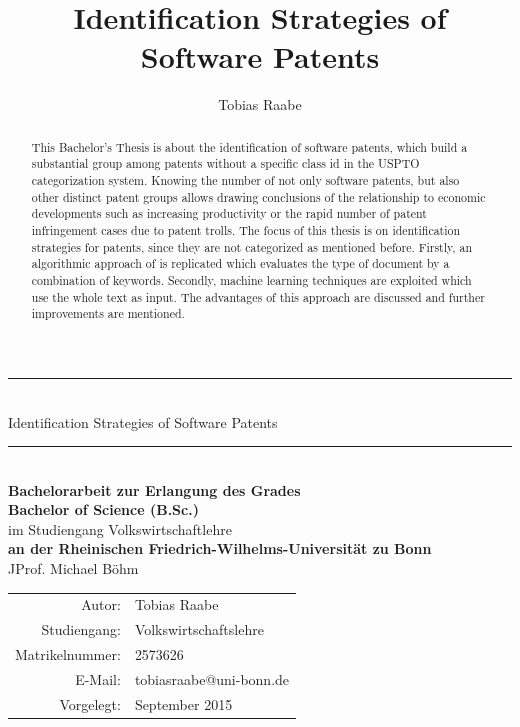\documentclass[12pt, a4paper, abstract, parskip]{scrartcl}
\author{Tobias Raabe}
\title{Identification Strategies of Software Patents}
\theoremstyle{definition}
\begin{document}

\newpage
\vspace*{2cm}
\begin{center}
\thispagestyle{empty}
\rule{14cm}{1pt}\\[1cm]
{\huge Identification Strategies of Software Patents}\\[1cm]
\rule{12cm}{1pt}\\[3cm]
\textbf{\large Bachelorarbeit zur Erlangung des Grades}\\[4pt]
\textbf{\large Bachelor of Science (B.Sc.)}\\[1cm]
{\large im Studiengang Volkswirtschaftlehre}\\[1cm]
\textbf{\large an der Rheinischen Friedrich-Wilhelms-Universität zu Bonn}\\[4pt]
{\large JProf. Michael Böhm}\\[4cm]
\begin{tabular}{rl}
\hline
Autor: & Tobias Raabe\\
Studiengang: & Volkswirtschaftslehre\\
Matrikelnummer: & 2573626\\
E-Mail: & tobiasraabe@uni-bonn.de\\
Vorgelegt: & September 2015\\
\hline
\end{tabular}
\end{center}
\newpage

\renewcommand*{\abstractname}{\large Abstract}
\begin{abstract}
    This Bachelor's Thesis is about the identification of software patents,
    which build a substantial group among patents without a specific class id
    in the USPTO categorization system. Knowing the number of not only software
    patents, but also other distinct patent groups allows drawing conclusions
    of the relationship to economic developments such as increasing
    productivity or the rapid number of patent infringement cases due to patent
    trolls. The focus of this thesis is on identification strategies for
    patents, since they are not categorized as mentioned before. Firstly, an
    algorithmic approach of \citet{bessen2007empirical} is replicated which
    evaluates the type of document by a combination of keywords. Secondly,
    machine learning techniques are exploited which use the whole text as
    input. The advantages of this approach are discussed and further
    improvements are mentioned.
\end{abstract}
\end{document}
